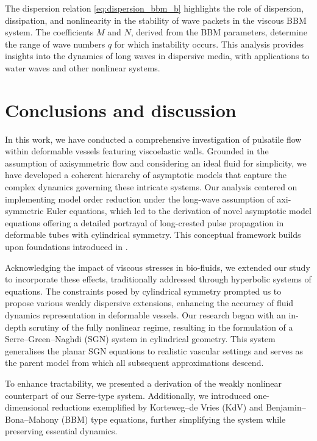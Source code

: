 \documentclass[alpha-refs, 12pt]{wiley-article}
\begin{document}
The dispersion relation \eqref{eq:dispersion_bbm_b} highlights the role of dispersion, dissipation, and nonlinearity in the stability of wave packets in the viscous BBM system. The coefficients $M$ and $N$, derived from the BBM parameters, determine the range of wave numbers $q$ for which instability occurs. This analysis provides insights into the dynamics of long waves in dispersive media, with applications to water waves and other nonlinear systems.

\section{Conclusions and discussion}\label{sec:discussion}

In this work, we have conducted a comprehensive investigation of pulsatile flow within deformable vessels featuring viscoelastic walls. Grounded in the assumption of axisymmetric flow and considering an ideal fluid for simplicity, we have developed a coherent hierarchy of asymptotic models that capture the complex dynamics governing these intricate systems. Our analysis centered on implementing model order reduction under the long-wave assumption of axi-symmetric Euler equations, which led to the derivation of novel asymptotic model equations offering a detailed portrayal of long-crested pulse propagation in deformable tubes with cylindrical symmetry. This conceptual framework builds upon foundations introduced in \cite{Mitsotakis2018}.

Acknowledging the impact of viscous stresses in bio-fluids, we extended our study to incorporate these effects, traditionally addressed through hyperbolic systems of equations. The constraints posed by cylindrical symmetry prompted us to propose various weakly dispersive extensions, enhancing the accuracy of fluid dynamics representation in deformable vessels. Our research began with an in-depth scrutiny of the fully nonlinear regime, resulting in the formulation of a Serre--Green--Naghdi (SGN) system in cylindrical geometry. This system generalises the planar SGN equations to realistic vascular settings and serves as the parent model from which all subsequent approximations descend.

To enhance tractability, we presented a derivation of the weakly nonlinear counterpart of our Serre-type system. Additionally, we introduced one-dimensional reductions exemplified by Korteweg--de Vries (KdV) and Benjamin--Bona--Mahony (BBM) type equations, further simplifying the system while preserving essential dynamics.
\end{document}
